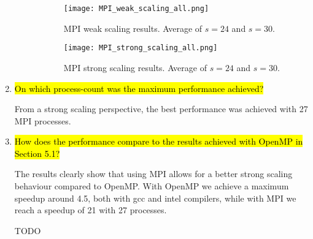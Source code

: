 \documentclass{article}
\begin{document}
\begin{enumerate}
\begin{description}
		\begin{figure}[p] %
		 	\begin{center}
		 		\texttt{[image: MPI\_weak\_scaling\_all.png]} %
		 		\caption{MPI weak scaling results. Average of $s=24$ and $s=30$.}
		 		\label{fig:MPI_weakScaling}
		 	\end{center}
		\end{figure}
		\begin{figure}[p] %
		 	\begin{center}
		 		\texttt{[image: MPI\_strong\_scaling\_all.png]} %
		 		\caption{MPI strong scaling results. Average of $s=24$ and $s=30$.}
		 		\label{fig:MPI_strongScaling}
		 	\end{center}
		\end{figure}
	\end{description}

	\item \hl{On which process-count was the maximum performance achieved?}

	From a strong scaling perspective, the best performance was achieved with 27 MPI processes.

	\item \hl{How does the performance compare to the results achieved with OpenMP in Section 5.1?}

	The results clearly show that using MPI allows for a better strong scaling behaviour compared to OpenMP. With OpenMP we achieve a maximum speedup around 4.5, both with gcc and intel compilers, while with MPI we reach a speedup of 21 with 27 processes.

	TODO
	
	
\end{enumerate}
\end{document}
